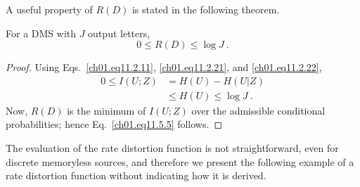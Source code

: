 A useful property of $R(D)$ is stated in the following theorem.

\begin{theorem}
For a DMS with $J$ output letters,
\begin{equation}
  0 \leq R \left( D \right)  \leq \log J~.
\label{ch01.eq11.5.5}
\end{equation}
\label{ch01.th11.5.1}
\end{theorem}

\begin{proof}
Using Eqs.~\eqref{ch01.eq11.2.11}, \eqref{ch01.eq11.2.21}, and
\eqref{ch01.eq11.2.22},
\begin{align}
        0 \leq I(U;Z) & = H(U) - H(U|Z) \nonumber       \\
                      & \leq H(U) \leq \log J~.
\label{ch01.eq11.5.6}
\end{align}
Now, $R(D)$ is the minimum of $I(U;Z)$ over the admissible conditional
probabilities; hence Eq.~\eqref{ch01.eq11.5.5} follows.
\end{proof}

The evaluation of the rate distortion function is not straightforward,
even for discrete memoryless sources, and therefore we present
the following example of a rate distortion function without indicating how
it is derived.

